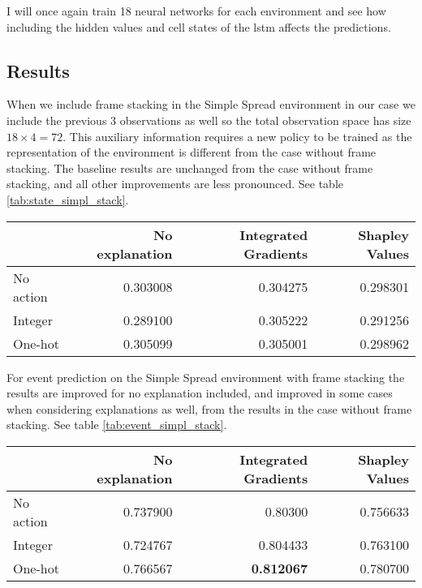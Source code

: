 \documentclass[UKenglish]{uiomasterthesis}
\begin{document}
I will once again train 18 neural networks for each environment and see how including the hidden values and cell states of the \ac{lstm} affects the predictions.

\subsection{Results}
When we include frame stacking in the Simple Spread environment in our case we include the previous 3 observations as well so the total observation space has size $18\times 4 = 72$. This auxiliary information requires a new policy to be trained as the representation of the environment is different from the case without frame stacking. The baseline results are unchanged from the case without frame stacking, and all other improvements are less pronounced. See table \ref{tab:state_simpl_stack}.

\begin{center}
\label{tab:state_simpl_stack}
\begin{tabular}{lrrr}
\toprule
 & No explanation & Integrated Gradients & Shapley Values \\
\midrule
No action & 0.303008 & 0.304275 & 0.298301 \\
Integer & 0.289100 & 0.305222 & 0.291256 \\
One-hot & 0.305099 & 0.305001 & 0.298962 \\
\bottomrule
\end{tabular}
\end{center}

For event prediction on the Simple Spread environment with frame stacking the results are improved for no explanation included, and improved in some cases when considering explanations as well, from the results in the case without frame stacking. See table \ref{tab:event_simpl_stack}.


\begin{center}
\label{tab:event_simpl_stack}
\begin{tabular}{lrrr}
\toprule
 & No explanation & Integrated Gradients & Shapley Values \\
\midrule
No action & 0.737900 & 0.80300 & 0.756633 \\
Integer & 0.724767 & 0.804433 & 0.763100 \\
One-hot & 0.766567 & \textbf{0.812067} & 0.780700 \\
\bottomrule
\end{tabular}
\end{center}
\end{document}
